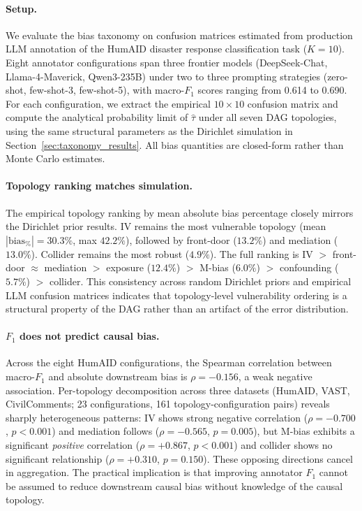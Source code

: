 \paragraph{Setup.}
We evaluate the bias taxonomy on confusion matrices estimated from production LLM annotation of the HumAID disaster response classification task ($K{=}10$). Eight annotator configurations span three frontier models (DeepSeek-Chat, Llama-4-Maverick, Qwen3-235B) under two to three prompting strategies (zero-shot, few-shot-3, few-shot-5), with macro-$F_1$ scores ranging from 0.614 to 0.690. For each configuration, we extract the empirical $10{\times}10$ confusion matrix and compute the analytical probability limit of $\hat{\tau}$ under all seven DAG topologies, using the same structural parameters as the Dirichlet simulation in Section~\ref{sec:taxonomy_results}. All bias quantities are closed-form rather than Monte Carlo estimates.

\paragraph{Topology ranking matches simulation.}
The empirical topology ranking by mean absolute bias percentage closely mirrors the Dirichlet prior results. IV remains the most vulnerable topology (mean $|\text{bias}_\%|{=}30.3\%$, max $42.2\%$), followed by front-door ($13.2\%$) and mediation ($13.0\%$). Collider remains the most robust ($4.9\%$). The full ranking is IV $>$ front-door $\approx$ mediation $>$ exposure ($12.4\%$) $>$ M-bias ($6.0\%$) $>$ confounding ($5.7\%$) $>$ collider. This consistency across random Dirichlet priors and empirical LLM confusion matrices indicates that topology-level vulnerability ordering is a structural property of the DAG rather than an artifact of the error distribution.

\paragraph{$F_1$ does not predict causal bias.}
Across the eight HumAID configurations, the Spearman correlation between macro-$F_1$ and absolute downstream bias is $\rho{=}{-}0.156$, a weak negative association. Per-topology decomposition across three datasets (HumAID, VAST, CivilComments; 23 configurations, 161 topology-configuration pairs) reveals sharply heterogeneous patterns: IV shows strong negative correlation ($\rho{=}{-}0.700$, $p{<}0.001$) and mediation follows ($\rho{=}{-}0.565$, $p{=}0.005$), but M-bias exhibits a significant \emph{positive} correlation ($\rho{=}{+}0.867$, $p{<}0.001$) and collider shows no significant relationship ($\rho{=}{+}0.310$, $p{=}0.150$). These opposing directions cancel in aggregation. The practical implication is that improving annotator $F_1$ cannot be assumed to reduce downstream causal bias without knowledge of the causal topology.

